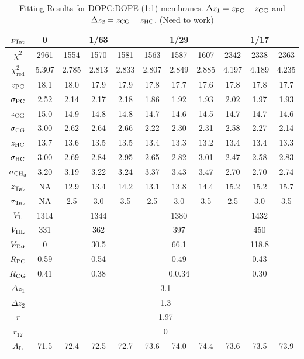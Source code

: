 \begin{table}[htbp]
  \centering
  \begin{tabular}{|c|c|c|c|c|c|c|c|c|c|c|}
    \hline
    $x_\textrm{Tat}$ & 0 & \multicolumn{3}{c|}{1/63} & \multicolumn{3}{c|}{1/29} & \multicolumn{3}{c|}{1/17} \\
    \hline
    $\chi^2$ & 2961 & 1554 & 1570 & 1581 & 1563 & 1587 & 1607 & 2342 & 2338 & 2363 \\ 
    $\chi^2_\textrm{red}$ & 5.307 & 2.785 & 2.813 & 2.833 & 2.807 & 2.849 & 2.885 & 4.197 & 4.189 & 4.235 \\
    \hline
    $z_\textrm{PC}$ & 18.1 & 18.0 & 17.9 & 17.9 & 17.8 & 17.7 & 17.6 & 17.8 & 17.8 & 17.7 \\
    $\sigma_\textrm{PC}$ & 2.52 & 2.14 & 2.17 & 2.18 & 1.86 & 1.92 & 1.93 & 2.02 & 1.97 & 1.93 \\
    $z_\textrm{CG}$ & 15.0 & 14.9 & 14.8 & 14.8 & 14.7 & 14.6 & 14.5 & 14.7 & 14.7 & 14.6 \\
    $\sigma_\textrm{CG}$ & 3.00 & 2.62 & 2.64 & 2.66 & 2.22 & 2.30 & 2.31 & 2.58 & 2.27 & 2.14 \\
    $z_\textrm{HC}$ & 13.7 & 13.6 & 13.5 & 13.5 & 13.4 & 13.3 & 13.2 & 13.4 & 13.4 & 13.3 \\ 
    $\sigma_\textrm{HC}$ & 3.00 & 2.69 & 2.84 & 2.95 & 2.65 & 2.82 & 3.01 & 2.47 & 2.58 & 2.83 \\
    $\sigma_{\textrm{CH}_3}$ & 3.20 & 3.19 & 3.22 & 3.24 & 3.37 & 3.43 & 3.47 & 2.70 & 2.70 & 2.74 \\
    $z_\textrm{Tat}$ & NA & 12.9 & 13.4 & 14.2 & 13.1 & 13.8 & 14.4 & 15.2 & 15.2 & 15.7 \\
    $\sigma_\textrm{Tat}$ & NA & 2.5 & 3.0 & 3.5 & 2.5 & 3.0 & 3.5 & 2.5 & 3.0 & 3.5 \\ 
    \hline
    $V_\textrm{L}$ & 1314 & \multicolumn{3}{c|}{1344} & \multicolumn{3}{c|}{1380} & \multicolumn{3}{c|}{1432} \\ 
    $V_\textrm{HL}$ & 331 & \multicolumn{3}{c|}{362} & \multicolumn{3}{c|}{397} & \multicolumn{3}{c|}{450} \\
    $V_\textrm{Tat}$ & 0 & \multicolumn{3}{c|}{30.5} & \multicolumn{3}{c|}{66.1} & \multicolumn{3}{c|}{118.8} \\
    $R_\textrm{PC}$ & 0.59 & \multicolumn{3}{c|}{0.54} & \multicolumn{3}{c|}{0.49} & \multicolumn{3}{c|}{0.43} \\
    $R_\textrm{CG}$ & 0.41 & \multicolumn{3}{c|}{0.38} & \multicolumn{3}{c|}{0.0.34} & \multicolumn{3}{c|}{0.30} \\
    \hline
    $\Delta z_1$ & \multicolumn{10}{c|}{3.1} \\
    $\Delta z_2$ & \multicolumn{10}{c|}{1.3} \\
    $r$ & \multicolumn{10}{c|}{1.97} \\
    $r_{12}$ & \multicolumn{10}{c|}{0} \\
    \hline
    $A_\textrm{L}$ & 71.5 & 72.4 & 72.5 & 72.7 & 73.6 & 74.0 & 74.4 & 73.6 & 73.5 & 73.9 \\
    \hline
  \end{tabular}
  \caption{Fitting Results for DOPC:DOPE (1:1) membranes. $\Delta z_1 = z_\textrm{PC}-z_\textrm{CG}$
  and $\Delta z_2 = z_\textrm{CG}-z_\textrm{HC}$. (Need to work)}
  \label{tb:DOPCDOPE1to1_fit_results}
\end{table}
